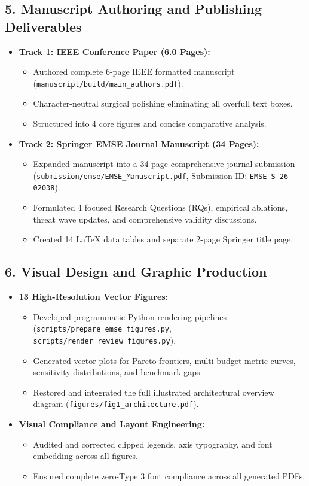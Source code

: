 \documentclass[11pt,a4paper]{article}
\begin{document}
\subsection{5. Manuscript Authoring and Publishing Deliverables}
\begin{itemize}
  \item \textbf{Track 1: IEEE Conference Paper (6.0 Pages):}
  \begin{itemize}
    \item Authored complete 6-page IEEE formatted manuscript (\nolinkurl{manuscript/build/main_authors.pdf}).
    \item Character-neutral surgical polishing eliminating all overfull text boxes.
    \item Structured into 4 core figures and concise comparative analysis.
  \end{itemize}
  \item \textbf{Track 2: Springer EMSE Journal Manuscript (34 Pages):}
  \begin{itemize}
    \item Expanded manuscript into a 34-page comprehensive journal submission (\nolinkurl{submission/emse/EMSE_Manuscript.pdf}, Submission ID: \texttt{EMSE-S-26-02038}).
    \item Formulated 4 focused Research Questions (RQs), empirical ablations, threat wave updates, and comprehensive validity discussions.
    \item Created 14 LaTeX data tables and separate 2-page Springer title page.
  \end{itemize}
\end{itemize}

\subsection{6. Visual Design and Graphic Production}
\begin{itemize}
  \item \textbf{13 High-Resolution Vector Figures:}
  \begin{itemize}
    \item Developed programmatic Python rendering pipelines (\nolinkurl{scripts/prepare_emse_figures.py}, \nolinkurl{scripts/render_review_figures.py}).
    \item Generated vector plots for Pareto frontiers, multi-budget metric curves, sensitivity distributions, and benchmark gaps.
    \item Restored and integrated the full illustrated architectural overview diagram (\nolinkurl{figures/fig1_architecture.pdf}).
  \end{itemize}
  \item \textbf{Visual Compliance and Layout Engineering:}
  \begin{itemize}
    \item Audited and corrected clipped legends, axis typography, and font embedding across all figures.
    \item Ensured complete zero-Type 3 font compliance across all generated PDFs.
  \end{itemize}
\end{itemize}
\end{document}
